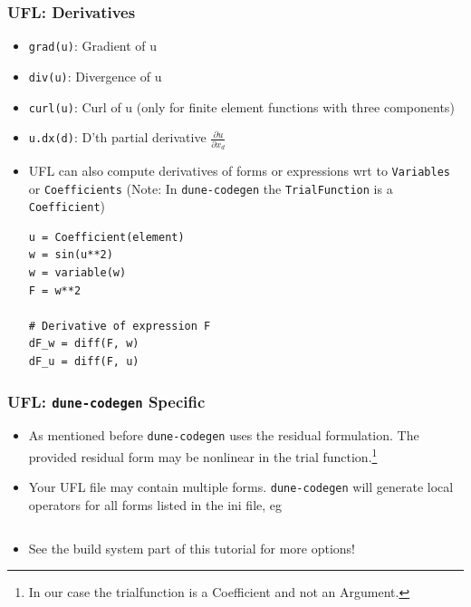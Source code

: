 \documentclass[aspectratio=169,11pt]{beamer}
\theoremstyle{definition}
\begin{document}
\begin{frame}[fragile]
  \frametitle{UFL: Derivatives}
  \begin{itemize}
  \item \lstinline{grad(u)}: Gradient of u
  \item \lstinline{div(u)}: Divergence of u
  \item \lstinline{curl(u)}: Curl of u (only for finite element functions with
    three components)
  \item \lstinline{u.dx(d)}: D'th partial derivative $\frac{\partial u}{\partial x_d}$
  \item UFL can also compute derivatives of forms or expressions wrt to
    \lstinline{Variables} or \lstinline{Coefficients} (Note: In
    \lstinline{dune-codegen} the \lstinline{TrialFunction} is a
    \lstinline{Coefficient})
    \begin{lstlisting}[basicstyle=\scriptsize, backgroundcolor=\color{listingbg}]
u = Coefficient(element)
w = sin(u**2)
w = variable(w)
F = w**2

# Derivative of expression F
dF_w = diff(F, w)
dF_u = diff(F, u)
    \end{lstlisting}
  \end{itemize}
\end{frame}

\begin{frame}[fragile]
  \frametitle{UFL: \lstinline{dune-codegen} Specific}
  \begin{itemize}
  \item As mentioned before \lstinline{dune-codegen} uses the residual
    formulation. The provided residual form may be nonlinear in the trial
    function.\footnote{In our case the trialfunction is a Coefficient and not
      an Argument.}
  \item Your UFL file may contain multiple forms. \lstinline{dune-codegen} will
    generate local operators for all forms listed in the ini file, eg
    \inputminted[fontsize=\small, firstline=12, lastline=13]{ini}{../src/heatequation.ini}
  \item See the build system part of this tutorial for more options!
  \end{itemize}
\end{frame}
\end{document}
